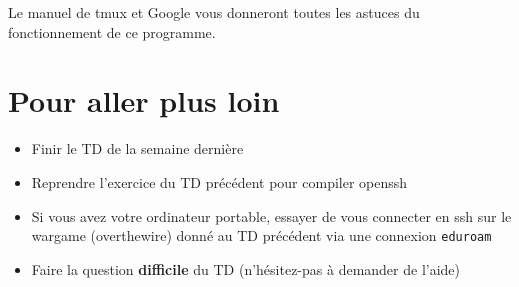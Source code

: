 \documentclass[11pt]{article}
\begin{document}
Le manuel de tmux et Google vous donneront toutes les astuces du fonctionnement de ce programme.

\section{Pour aller plus loin}

\begin{itemize}
\item Finir le TD de la semaine dernière
\item Reprendre l'exercice du TD précédent pour compiler openssh
\item Si vous avez votre ordinateur portable, essayer de vous connecter en ssh sur le wargame (overthewire) donné au TD précédent via une connexion \texttt{eduroam}
\item Faire la question \textbf{difficile} du TD (n'hésitez-pas à demander de l'aide)
\end{itemize}
\end{document}

